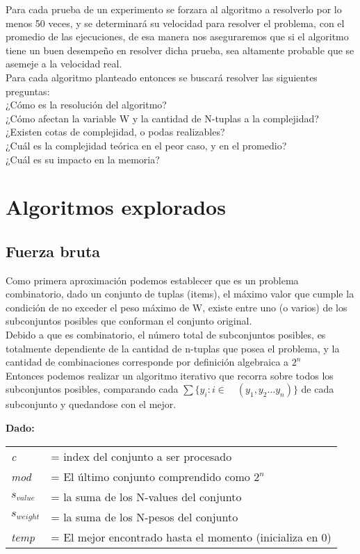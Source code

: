 \documentclass[fleqn, 11pt]{article}
\begin{document}
Para cada prueba de un experimento se forzara al algoritmo a resolverlo por lo menos 50 veces, y se determinará su velocidad para resolver el problema, con el promedio de las ejecuciones, de esa manera nos aseguraremos que si el algoritmo tiene un buen desempeño en resolver dicha prueba, sea altamente probable que se asemeje a la velocidad real.  \\

Para cada algoritmo planteado entonces se buscará resolver las siguientes preguntas:\\

¿Cómo es la resolución del algoritmo?  \\
¿Cómo afectan la variable W y la cantidad de N-tuplas a la complejidad? \\
¿Existen cotas de complejidad, o podas realizables?  \\
¿Cuál es la complejidad teórica en el peor caso, y en el promedio?  \\
¿Cuál es su impacto en la memoria?  \\

\section{Algoritmos explorados}

\subsection{Fuerza bruta}

Como primera aproximación podemos establecer que es un problema combinatorio, dado un conjunto de tuplas (items),
el máximo valor que cumple la condición de no exceder el peso máximo de W, existe entre uno (o varios) de los
subconjuntos posibles que conforman el conjunto original. \\

Debido a que es combinatorio, el número total de subconjuntos posibles, es totalmente dependiente de la
cantidad de n-tuplas que posea el problema, y la cantidad de combinaciones corresponde por definición algebraica a $2^n$  \\

Entonces podemos realizar un algoritmo iterativo que recorra sobre todos los subconjuntos posibles, comparando cada $\sum \{ y_i : i \in  \quad (y_1, y_2 \dots y_n)\}$ de cada subconjunto y quedandose con el mejor.

\textbf{Dado:}

\begin{tabular}{l l}
    \textit{c} & = index del conjunto a ser procesado \\
    \textit{mod} & = El último conjunto comprendido como $2^n$ \\
    \textit{$s_{value}$} & = la suma de los N-values del conjunto \\
    \textit{$s_{weight}$} & = la suma de los N-pesos del conjunto \\
    \textit{temp} & = El mejor encontrado hasta el momento (inicializa en 0) \\
\end{tabular}
\end{document}
